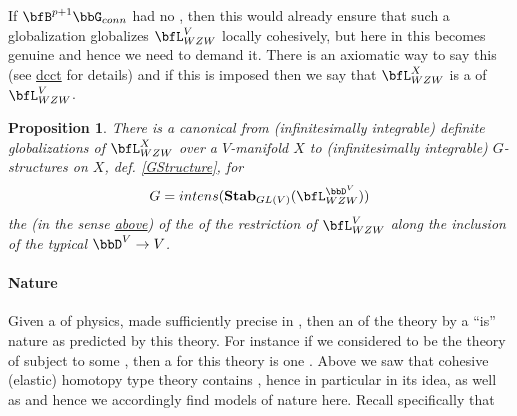 \documentclass[12pt,titlepage]{article}
\theoremstyle{plain}
\newtheorem{prop}{Proposition}
\theoremstyle{definition}
\theoremstyle{remark}
\begin{document}
If $\bfB^{p+1}\bbG_{conn}$ had no , then this would already ensure that such a globalization globalizes $\bfL_{WZW}^V$ locally cohesively, but here in  this  becomes genuine  and hence we need to demand it. There is an axiomatic way to say this (see \hyperlink{dcct}{dcct} for details) and if this is imposed then we say that $\bfL_{WZW}^X$ is a  of $\bfL_{WZW}^V$.
\begin{prop}
\label{DefiniteGlobalizationsToGStructure}\hypertarget{DefiniteGlobalizationsToGStructure}{}
There is a canonical  from (infinitesimally integrable) definite globalizations of $\bfL_{WZW}^X$ over a $V$-manifold $X$ to (infinitesimally integrable) $G$-structures on $X$, def. \ref{GStructure}, for
\begin{displaymath}
G = intens(\mathbf{Stab}_{GL(V)}(\bfL_{WZW}^{\bbD^V}))
\end{displaymath}
the  (in the sense \hyperlink{IntensiveExtensive}{above}) of the  of the restriction of $\bfL_{WZW}^V$ along the inclusion of the typical  $\bbD^V \to V$.
\end{prop}
\hypertarget{nature}{}\paragraph*{{Nature}}\label{nature}
Given a  of physics, made sufficiently precise in , then an  of the theory by a  ``is'' nature as predicted by this theory.
For instance if we considered  to be the theory of  subject to some , then a  for this theory is one  .
Above we saw that cohesive (elastic) homotopy type theory contains , hence in particular  in its idea, as well as  and hence we accordingly find models of nature here.
Recall specifically that
\end{document}
